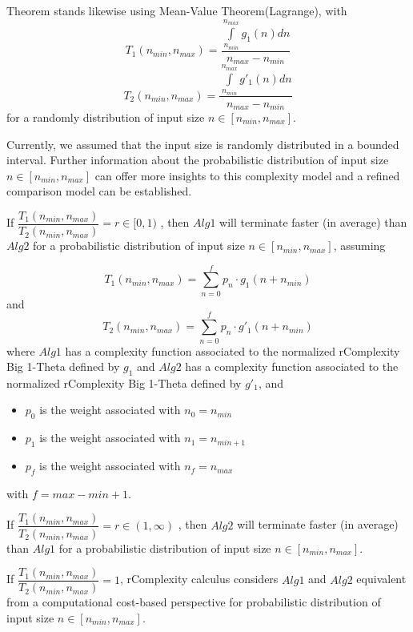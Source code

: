 \begin{remark}
Theorem stands likewise using Mean-Value Theorem(Lagrange), with 
\[  T_{1}(n_{min}, n_{max}) = \dfrac{\int\limits_{n_{min}}^{n_{max}} g_{1}(n) dn}{n_{max} - n_{min}}  \]
\[  T_{2}(n_{min}, n_{max}) = \dfrac{\int\limits_{n_{min}}^{n_{max}} g'_{1}(n) dn}{n_{max} - n_{min}}  \]
for a randomly distribution of input size $n \in [n_{min}, n_{max}]$.
\end{remark}

Currently, we assumed that the input size is randomly distributed in a bounded interval. Further information about the probabilistic distribution of input size $n \in [n_{min}, n_{max}]$ can offer more insights to this complexity model and a refined comparison model can be established.

\begin{theorem}
If $ \dfrac{T_{1}(n_{min}, n_{max})}{T_{2}(n_{min}, n_{max})} = r \in [0,1) $ , then $Alg1$ will terminate faster (in average) than $Alg2$ for a probabilistic distribution of input size $n \in [n_{min}, n_{max}]$,  assuming


 \[T_{1}(n_{min}, n_{max}) = \sum\limits_{n=0}^{f} p_{n} \cdot g_{1}(n + n_{min})\] and \[T_{2}(n_{min}, n_{max}) = \sum\limits_{n=0}^{f} p_{n} \cdot g'_{1}(n + n_{min})\] where $Alg1$ has a complexity function associated to the normalized rComplexity Big 1-Theta defined by $g_{1}$ and $Alg2$ has a complexity function associated to the normalized rComplexity Big 1-Theta defined by $g'_{1}$, and

\begin{itemize}
	\item $p_{0}$ is the weight associated with $n_{0} = n_{min}$
	\item $p_{1}$ is the weight associated with $n_{1} = n_{min + 1}$
	\item $p_{f}$ is the weight associated with $n_{f} = n_{max}$
\end{itemize}
with $f = max - min + 1$.

\end{theorem}

\begin{corollary}
If $ \dfrac{T_{1}(n_{min}, n_{max})}{T_{2}(n_{min}, n_{max})} = r \in (1,\infty) $ , then $Alg2$ will terminate faster (in average) than $Alg1$ for a probabilistic distribution of input size $n \in [n_{min}, n_{max}]$.
\end{corollary}

\begin{remark}
If  $ \dfrac{T_{1}(n_{min}, n_{max})}{T_{2}(n_{min}, n_{max})} = 1$, rComplexity calculus considers $Alg1$ and $Alg2$ equivalent from a computational cost-based perspective for probabilistic distribution of input size $n \in [n_{min}, n_{max}]$.
\end{remark}

